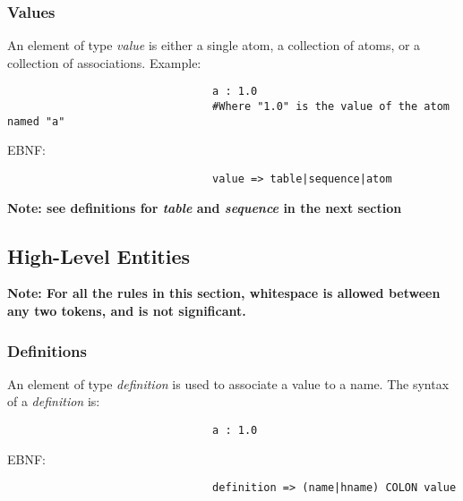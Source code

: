 \documentclass{article}
\begin{document}
                \subsubsection{Values}
                        An element of type \emph{value} is either a single atom, 
                        a collection of atoms,
                        or a collection of associations.
                        Example:
                        \begin{verbatim}
                                a : 1.0
                                #Where "1.0" is the value of the atom named "a"
                        \end{verbatim}
                        
                        \vspace{1mm}
                        \par
                        EBNF:
                        \begin{verbatim}
                                value => table|sequence|atom
                        \end{verbatim}  
                        \vspace{1mm}
                        \par
                        \bf Note: \rm see definitions for \emph{table} 
                        and \emph{sequence} 
                        in the next section
        \subsection{High-Level Entities}
                \bf Note: \rm For all the rules in this section,
                whitespace is allowed between any two tokens,
                and is not significant.
                                                
                \subsubsection{Definitions}
                        An element of type \emph{definition} is used to associate a value to a name.
                        The syntax of a \emph{definition} is:
                        \begin{verbatim}
                                a : 1.0
                        \end{verbatim}
                        \vspace{1mm}
                        \par
                        EBNF:
                        \begin{verbatim}
                                definition => (name|hname) COLON value
                        \end{verbatim}  
\end{document}
